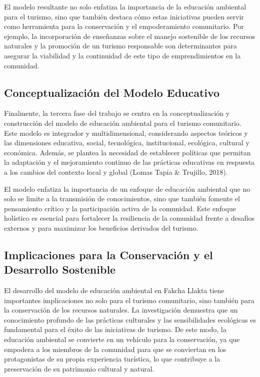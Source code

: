 \documentclass[
  letterpaper,
  DIV=11,
  numbers=noendperiod,
  oneside]{scrreprt}
\begin{document}
El modelo resultante no solo enfatiza la importancia de la educación
ambiental para el turismo, sino que también destaca cómo estas
iniciativas pueden servir como herramienta para la conservación y el
empoderamiento comunitario. Por ejemplo, la incorporación de enseñanzas
sobre el manejo sostenible de los recursos naturales y la promoción de
un turismo responsable son determinantes para asegurar la viabilidad y
la continuidad de este tipo de emprendimientos en la comunidad.

\subsection{Conceptualización del Modelo
Educativo}\label{conceptualizaciuxf3n-del-modelo-educativo}

Finalmente, la tercera fase del trabajo se centra en la
conceptualización y construcción del modelo de educación ambiental para
el turismo comunitario. Este modelo es integrador y multidimensional,
considerando aspectos teóricos y las dimensiones educativa, social,
tecnológica, institucional, ecológica, cultural y económica. Además, se
plantea la necesidad de establecer políticas que permitan la adaptación
y el mejoramiento continuo de las prácticas educativas en respuesta a
los cambios del contexto local y global (Lomas Tapia \& Trujillo, 2018).

El modelo enfatiza la importancia de un enfoque de educación ambiental
que no solo se limite a la transmisión de conocimientos, sino que
también fomente el pensamiento crítico y la participación activa de la
comunidad. Este enfoque holístico es esencial para fortalecer la
resiliencia de la comunidad frente a desafíos externos y para maximizar
los beneficios derivados del turismo.

\subsection{Implicaciones para la Conservación y el Desarrollo
Sostenible}\label{implicaciones-para-la-conservaciuxf3n-y-el-desarrollo-sostenible}

El desarrollo del modelo de educación ambiental en Fakcha Llakta tiene
importantes implicaciones no solo para el turismo comunitario, sino
también para la conservación de los recursos naturales. La investigación
demuestra que un conocimiento profundo de las prácticas culturales y las
sensibilidades ecológicas es fundamental para el éxito de las
iniciativas de turismo. De este modo, la educación ambiental se
convierte en un vehículo para la conservación, ya que empodera a los
miembros de la comunidad para que se conviertan en los protagonistas de
su propia experiencia turística, lo que contribuye a la preservación de
su patrimonio cultural y natural.
\end{document}
